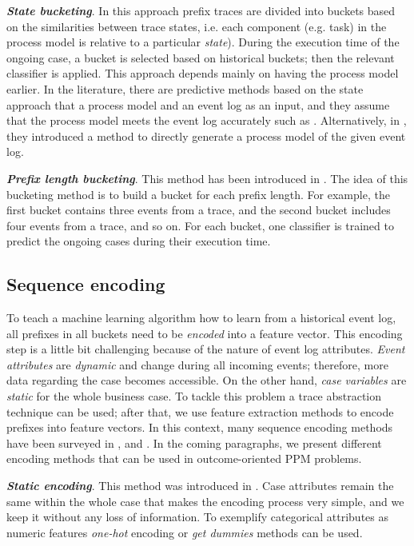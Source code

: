 \textbf{\textit{State bucketing}}. In this approach prefix traces are divided into buckets based on the similarities between trace states, i.e. each component (e.g. task) in the process model is relative to a particular \textit{state}). During the execution time of the ongoing case, a bucket is selected based on historical buckets; then the relevant classifier is applied. This approach depends mainly on having the process model earlier. In the literature, there are predictive methods based on the state approach that a process model and an event log as an input, and they assume that the process model meets the event log accurately such as \cite{grigori2001improving, conforti2015recommendation, schwegmann2013method}. Alternatively, in \cite{lakshmanan2010predictive}, they introduced a method to directly generate a process model of the given event log. 

\textbf{\textit{Prefix length bucketing}}. This method has been introduced in \cite{leontjeva2016complex, van2012process}. The idea of this bucketing method is to build a bucket for each prefix length. For example, the first bucket contains three events from a trace, and the second bucket includes four events from a trace, and so on. For each bucket, one classifier is trained to predict the ongoing cases during their execution time. 

\subsection{Sequence encoding}
To teach a machine learning algorithm how to learn from a historical event log, all prefixes in all buckets need to be \textit{encoded} into a feature vector. This encoding step is a little bit challenging because of the nature of event log attributes. \textit{Event attributes} are \textit{dynamic} and change during all incoming events; therefore, more data regarding the case becomes accessible. On the other hand, \textit{case variables} are \textit{static} for the whole business case. To tackle this problem a trace abstraction technique \cite{van2010process} can be used; after that, we use feature extraction methods to encode prefixes into feature vectors. In this context, many sequence encoding methods have been surveyed in \cite{leontjeva2016complex}, and \cite{teinemaa2019outcome}. In the coming paragraphs, we present different encoding methods that can be used in outcome-oriented PPM problems. 

\textbf{\textit{Static encoding}}.
This method was introduced in \cite{leontjeva2016complex}. Case attributes remain the same within the whole case that makes the encoding process very simple, and we keep it without any loss of information. To exemplify categorical attributes as numeric features \textit{one-hot} encoding or \textit{get dummies} methods can be used. 

